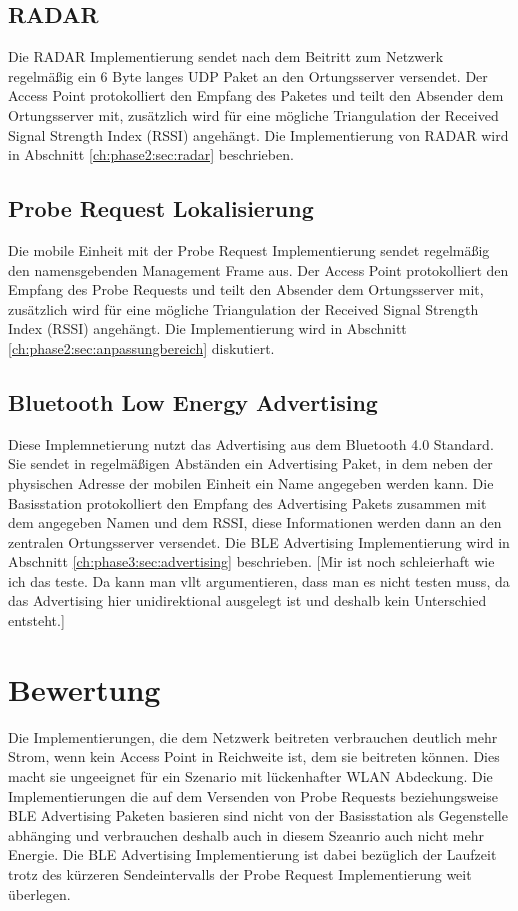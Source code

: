 \subsection{RADAR}
Die RADAR Implementierung sendet nach dem Beitritt zum Netzwerk regelmäßig ein 6 Byte langes UDP Paket an den Ortungsserver versendet.
Der Access Point protokolliert den Empfang des Paketes und teilt den Absender dem Ortungsserver mit, zusätzlich wird für eine mögliche Triangulation der Received Signal Strength Index (RSSI) angehängt.
Die Implementierung von RADAR wird in Abschnitt \ref{ch:phase2:sec:radar} beschrieben.

\subsection{Probe Request Lokalisierung}
Die mobile Einheit mit der Probe Request Implementierung sendet regelmäßig den namensgebenden Management Frame aus.
Der Access Point protokolliert den Empfang des Probe Requests und teilt den Absender dem Ortungsserver mit, zusätzlich wird für eine mögliche Triangulation der Received Signal Strength Index (RSSI) angehängt.
Die Implementierung wird in Abschnitt \ref{ch:phase2:sec:anpassungbereich} diskutiert.

\subsection{Bluetooth Low Energy Advertising}
Diese Implemnetierung nutzt das Advertising aus dem Bluetooth 4.0 Standard.
Sie sendet in regelmäßigen Abständen ein Advertising Paket, in dem neben der physischen Adresse der mobilen Einheit ein Name angegeben werden kann.
Die Basisstation protokolliert den Empfang des Advertising Pakets zusammen mit dem angegeben Namen und dem RSSI, diese Informationen werden dann an den zentralen Ortungsserver versendet.
Die BLE Advertising Implementierung wird in Abschnitt \ref{ch:phase3:sec:advertising} beschrieben.
[Mir ist noch schleierhaft wie ich das teste. Da kann man vllt argumentieren, dass man es nicht testen muss, da das Advertising hier unidirektional ausgelegt ist und deshalb kein Unterschied entsteht.]

\section{Bewertung}
Die Implementierungen, die dem Netzwerk beitreten verbrauchen deutlich mehr Strom, wenn kein Access Point in Reichweite ist, dem sie beitreten können.
Dies macht sie ungeeignet für ein Szenario mit lückenhafter WLAN Abdeckung.
Die Implementierungen die auf dem Versenden von Probe Requests beziehungsweise BLE Advertising Paketen basieren sind nicht von der Basisstation als Gegenstelle abhänging und verbrauchen deshalb auch in diesem Szeanrio auch nicht mehr Energie.
Die BLE Advertising Implementierung ist dabei bezüglich der Laufzeit trotz des kürzeren Sendeintervalls der Probe Request Implementierung weit überlegen.
